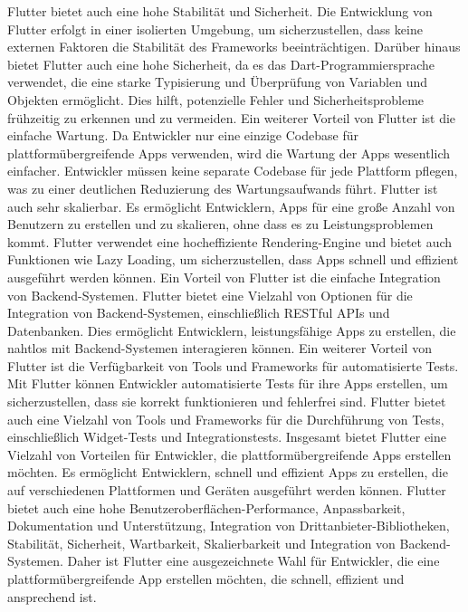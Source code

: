 Flutter bietet auch eine hohe Stabilität und Sicherheit. Die Entwicklung von Flutter erfolgt in einer isolierten Umgebung, um sicherzustellen, dass keine externen Faktoren die Stabilität des Frameworks beeinträchtigen. 
Darüber hinaus bietet Flutter auch eine hohe Sicherheit, da es das Dart-Programmiersprache verwendet, die eine starke Typisierung und Überprüfung von Variablen und Objekten ermöglicht. 
Dies hilft, potenzielle Fehler und Sicherheitsprobleme frühzeitig zu erkennen und zu vermeiden.
Ein weiterer Vorteil von Flutter ist die einfache Wartung. 
Da Entwickler nur eine einzige Codebase für plattformübergreifende Apps verwenden, wird die Wartung der Apps wesentlich einfacher. 
Entwickler müssen keine separate Codebase für jede Plattform pflegen, was zu einer deutlichen Reduzierung des Wartungsaufwands führt.
Flutter ist auch sehr skalierbar. Es ermöglicht Entwicklern, Apps für eine große Anzahl von Benutzern zu erstellen und zu skalieren, ohne dass es zu Leistungsproblemen kommt. 
Flutter verwendet eine hocheffiziente Rendering-Engine und bietet auch Funktionen wie Lazy Loading, um sicherzustellen, dass Apps schnell und effizient ausgeführt werden können.
Ein Vorteil von Flutter ist die einfache Integration von Backend-Systemen. 
Flutter bietet eine Vielzahl von Optionen für die Integration von Backend-Systemen, einschließlich RESTful APIs und Datenbanken. 
Dies ermöglicht Entwicklern, leistungsfähige Apps zu erstellen, die nahtlos mit Backend-Systemen interagieren können.
Ein weiterer Vorteil von Flutter ist die Verfügbarkeit von Tools und Frameworks für automatisierte Tests. 
Mit Flutter können Entwickler automatisierte Tests für ihre Apps erstellen, um sicherzustellen, dass sie korrekt funktionieren und fehlerfrei sind. 
Flutter bietet auch eine Vielzahl von Tools und Frameworks für die Durchführung von Tests, einschließlich Widget-Tests und Integrationstests.
Insgesamt bietet Flutter eine Vielzahl von Vorteilen für Entwickler, die plattformübergreifende Apps erstellen möchten.
Es ermöglicht Entwicklern, schnell und effizient Apps zu erstellen, die auf verschiedenen Plattformen und Geräten ausgeführt werden können. 
Flutter bietet auch eine hohe Benutzeroberflächen-Performance, Anpassbarkeit, Dokumentation und Unterstützung, Integration von Drittanbieter-Bibliotheken, Stabilität, Sicherheit, Wartbarkeit, Skalierbarkeit und Integration von Backend-Systemen. 
Daher ist Flutter eine ausgezeichnete Wahl für Entwickler, die eine plattformübergreifende App erstellen möchten, die schnell, effizient und ansprechend ist.
\newpage

